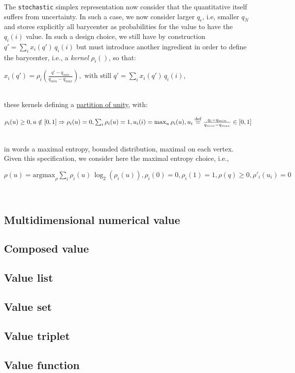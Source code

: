 \documentclass[a4,12pt]{article}
\newcommand{\deq}{\stackrel {\rm def}{=}}
\newcommand{\eqline}[1]{\\\centerline{$#1$}\\}
\begin{document}
The {\tt stochastic} simplex representation now consider that the quantitative itself suffers from uncertainty. In such a case, we now consider larger $q_\epsilon$, i.e, smaller $q_N$ and stores explicitly all barycenter as probabilities for the value to have the $q_i(i)$ value. In such a design choice, we still have by construction $q' = \sum_i x_i(q') \, q_i(i)$ but must introduce another ingredient in order to define the barycenter, i.e., a {\em kernel} $\rho_i()$, so that:
\eqline{x_i(q') = \rho_i\left(\frac{q' - q_{min}}{q_{min} - q_{max}}\right), \mbox{ with still } q' = \sum_i x_i(q') \, q_i(i),}
these kernels defining a \href{https://en.wikipedia.org/wiki/Partition_of_unity}{partition of unity}, with:
\eqline{\rho_i(u) \geq 0, u \notin [0, 1] \Rightarrow \rho_i(u) = 0, \sum_i \rho_i(u) = 1, u_i(i) = \max_u \rho_i(u), u_i \deq \frac{q_i - q_{min}}{q_{min} - q_{max}} \in [0, 1]}
in words a maximal entropy, bounded distribution, maximal on each vertex. Given this specification, we consider here the maximal entropy choice, i.e., 
\eqline{\rho(u) = \mbox{argmax}_\rho \sum_i \rho_i(u) \, \log_2(\rho_i(u)), \rho_i(0) = 0, \rho_i(1) = 1, \rho(q) \geq 0, \rho'_i(u_i) = 0}





\subsection*{Multidimensional numerical value} 

\subsection*{Composed value} 

\subsection*{Value list} 

\subsection*{Value set} 

\subsection*{Value triplet} 

\subsection*{Value function} 

\fi

{\scriptsize  }

\end{document}
